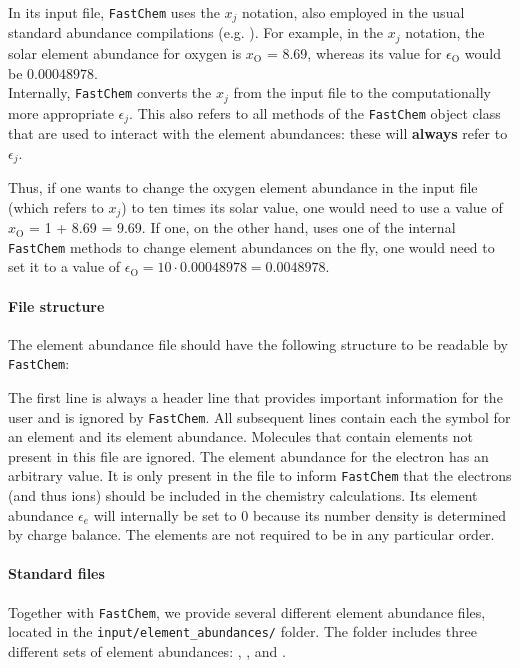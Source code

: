 \documentclass[numbers=noenddot]{aux/fcmanual}
\newcommand{\fc}{\texttt{FastChem}\xspace}
\begin{document}
In its input file, \fc uses the $x_j$ notation, also employed in the usual standard abundance compilations (e.g. \citet{Asplund2009ARA&A..47..481A}). For example, in the $x_j$ notation, the solar element abundance for oxygen is $x_\mathrm{O}$ = 8.69, whereas its value for $\epsilon_\mathrm{O}$ would be $0.00048978$.\\

Internally, \fc converts the $x_j$ from the input file to the computationally more appropriate $\epsilon_j$. This also refers to all methods of the \fc object class that are used to interact with the element abundances: these will \textbf{always} refer to $\epsilon_j$. 

Thus, if one wants to change the oxygen element abundance in the input file (which refers to $x_j$) to ten times its solar value, one would need to use a value of $x_\mathrm{O}$ = 1 + 8.69 = 9.69. If one, on the other hand, uses one of the internal \fc methods to change element abundances on the fly, one would need to set it to a value of $\epsilon_\mathrm{O} = 10 \cdot 0.00048978 =  0.0048978$.

\newpage
\paragraph{File structure}
The element abundance file should have the following structure to be readable by \fc:


The first line is always a header line that provides important information for the user and is ignored by \fc. All subsequent lines contain each the symbol for an element and its element abundance. Molecules that contain elements not present in this file are ignored. The element abundance for  the electron has an arbitrary value. It is only present in the file to inform \fc that the electrons (and thus ions) should be included in the chemistry calculations. Its element abundance $\epsilon_e$ will internally be set to 0 because its number density is determined by charge balance. The elements are not required to be in any particular order. 


\paragraph{Standard files}
Together with \fc, we provide several different element abundance files, located in the \verb|input/element_abundances/| folder. The folder includes three different sets of element abundances: \citet{Asplund2009ARA&A..47..481A}, \citet{Asplund2021A&A...653A.141A}, and \citet{Lodders2003ApJ...591.1220L}.
\end{document}

